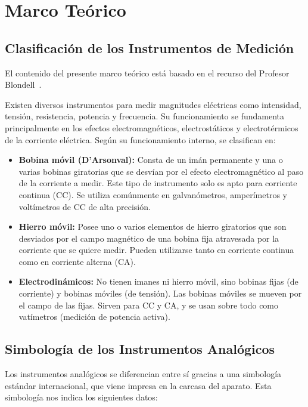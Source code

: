 \section{Marco Teórico}

\subsection{Clasificación de los Instrumentos de Medición}

El contenido del presente marco teórico está basado en el recurso del Profesor Blondell~\cite{blondell}.

Existen diversos instrumentos para medir magnitudes eléctricas como intensidad, tensión, resistencia, potencia y frecuencia. Su funcionamiento se fundamenta principalmente en los efectos electromagnéticos, electrostáticos y electrotérmicos de la corriente eléctrica. Según su funcionamiento interno, se clasifican en:

\begin{itemize}
    \item \textbf{Bobina móvil (D'Arsonval):} Consta de un imán permanente y una o varias bobinas giratorias que se desvían por el efecto electromagnético al paso de la corriente a medir. Este tipo de instrumento solo es apto para corriente continua (CC). Se utiliza comúnmente en galvanómetros, amperímetros y voltímetros de CC de alta precisión.

    \item \textbf{Hierro móvil:} Posee uno o varios elementos de hierro giratorios que son desviados por el campo magnético de una bobina fija atravesada por la corriente que se quiere medir. Pueden utilizarse tanto en corriente continua como en corriente alterna (CA).

    \item \textbf{Electrodinámicos:} No tienen imanes ni hierro móvil, sino bobinas fijas (de corriente) y bobinas móviles (de tensión). Las bobinas móviles se mueven por el campo de las fijas. Sirven para CC y CA, y se usan sobre todo como vatímetros (medición de potencia activa).
\end{itemize}

\subsection{Simbología de los Instrumentos Analógicos}

Los instrumentos analógicos se diferencian entre sí gracias a una simbología estándar internacional, que viene impresa en la carcasa del aparato. Esta simbología nos indica los siguientes datos:

